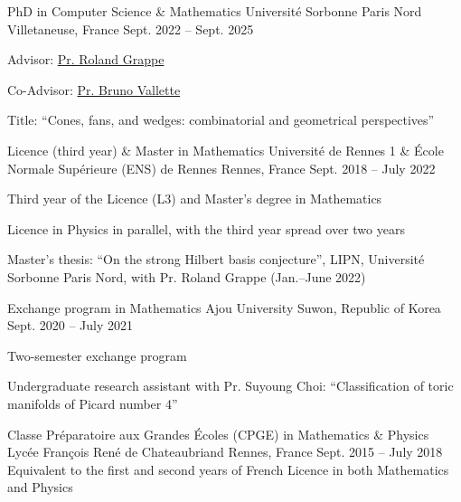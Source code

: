 

\begin{cventries}

  \cventry
    {PhD in Computer Science \& Mathematics} %
    {Université Sorbonne Paris Nord} %
    {Villetaneuse, France} %
    {Sept. 2022 -- Sept. 2025} %
    {
      \begin{cvitems} %
        \item {Advisor: \href{https://www.lamsade.dauphine.fr/~rgrappe/}{Pr. Roland Grappe}}
        \item {Co-Advisor: \href{https://www.math.univ-paris13.fr/~vallette/}{Pr. Bruno Vallette}}
        \item {Title: ``Cones, fans, and wedges: combinatorial and geometrical perspectives''}
      \end{cvitems}
    }
\vspace*{.7cm}
  \cventry
    {Licence (third year) \& Master in Mathematics} %
    {Université de Rennes 1 \& \'Ecole Normale Supérieure (ENS) de Rennes} %
    {Rennes, France} %
    {Sept. 2018 -- July 2022} %
    {
    	\begin{cvitems} %
    		\item {Third year of the Licence (L3) and Master's degree in Mathematics}
    		\item {Licence in Physics in parallel, with the third year spread over two years}
    		\item {Master's thesis: ``On the strong Hilbert basis conjecture'', LIPN, Université Sorbonne Paris Nord, with Pr. Roland Grappe (Jan.--June 2022)}
    	\end{cvitems}
    }
    \vspace*{.7cm}
	\cventry
	{Exchange program in Mathematics} %
	{Ajou University} %
	{Suwon, Republic of Korea} %
	{Sept. 2020 -- July 2021} %
	{
		\begin{cvitems} %
			\item {Two-semester exchange program}
			\item {Undergraduate research assistant with Pr. Suyoung Choi: ``Classification of toric manifolds of Picard number 4''}
		\end{cvitems}
	}
	\vspace*{.7cm}
    \cventry
    {Classe Préparatoire aux Grandes Écoles (CPGE) in Mathematics \& Physics} %
    {Lycée François René de Chateaubriand} %
    {Rennes, France} %
    {Sept. 2015 -- July 2018} %
    {Equivalent to the first and second years of French Licence in both Mathematics and Physics}

\end{cventries}
\vspace{1.4pt} %
